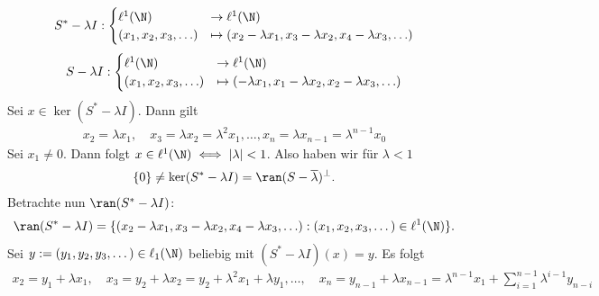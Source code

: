 \begin{solution}
\begin{align*}
  S^* - \lambda I:
  \begin{cases}
    \ell^1(\N)             & \to     \ell^1(\N) \\
    (x_1, x_2, x_3, \ldots) & \mapsto (x_2 - \lambda x_1, x_3 - \lambda x_2, x_4 - \lambda x_3, \ldots)
  \end{cases}
\end{align*}
\begin{align*}
  S - \lambda I:
  \begin{cases}
    \ell^1(\N)             & \to     \ell^1(\N) \\
    (x_1, x_2, x_3, \ldots) & \mapsto (- \lambda x_1, x_1 - \lambda x_2, x_2 - \lambda x_3, \ldots)
  \end{cases}
\end{align*}
Sei $x \in \ker(S^* - \lambda I)$. Dann gilt
\begin{align*}
  x_2 = \lambda x_1, \quad x_3 = \lambda x_2 = \lambda^2 x_1, \dots, x_n = \lambda x_{n-1} = \lambda^{n-1} x_0
\end{align*}
Sei $x_1 \neq 0$. Dann folgt $x \in \ell^1(\N) \iff |\lambda| < 1$.
Also haben wir für $\lambda < 1$
\begin{align*}
  \{0\} \neq \ker(S^* - \lambda I) = \ran(S - \overline{\lambda})^{\bot}.
\end{align*}
Betrachte nun $\ran(S^* - \lambda I)$:
\begin{align*}
  \ran(S^* - \lambda I) = \{(x_2 - \lambda x_1, x_3 - \lambda x_2, x_4 - \lambda x_3, \ldots): (x_1,x_2,x_3,\dots) \in \ell^1(\N)\}.
\end{align*}
Sei $y := (y_1,y_2,y_3,\dots) \in \ell_1(\N)$ beliebig mit $(S^* - \lambda I) (x) = y$. Es folgt
\begin{align*}
  x_2 = y_1 + \lambda x_1, \quad x_3 = y_2 + \lambda x_2 = y_2 + \lambda^2x_1 + \lambda y_1,
  \dots, \quad x_n = y_{n-1} + \lambda x_{n-1} = \lambda^{n-1}x_1 + \sum_{i=1}^{n-1}\lambda^{i-1} y_{n-i}
\end{align*}

\end{solution}
